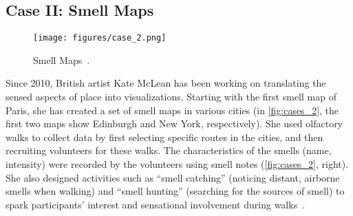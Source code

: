 \subsection{Case II: Smell Maps}
\label{ssection:smell}

\begin{figure}[h]
 \centering
 \texttt{[image: figures/case\_2.png]}
 \vspace{-2em}
 \caption{Smell Maps~\cite{smellmaps}.}
 \label{fig:cases_2}
 \vspace{-1em}
\end{figure}


Since 2010, British artist Kate McLean has been working on translating the sensed aspects of place into visualizations. Starting with the first smell map of Paris, she has created a set of smell maps in various cities (\eg in \autoref{fig:cases_2}, the first two maps show Edinburgh and New York, respectively).
She used olfactory walks to collect data by first selecting specific routes in the cities, and then recruiting volunteers for these walks. The characteristics of the smells (\eg name, intensity) were recorded by the volunteers using smell notes (\autoref{fig:cases_2}, right). She also designed activities such as ``smell catching'' (noticing distant, airborne smells when walking) and ``smell hunting'' (searching for the sources of smell) to spark participants' interest and sensational involvement during walks~\cite{mclean2019nose}. 


